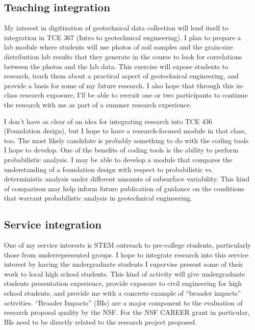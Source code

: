 \documentclass[10pt,letterpaper]{article}
\begin{document}
\subsection*{Teaching integration}
My interest in digitization of geotechnical data collection will lend itself to integration in TCE 367 (Intro to geotechnical engineering).
I plan to prepare a lab module where students will use photos of soil samples and the grain-size distribution lab results that they generate in the course to look for correlations between the photos and the lab data.
This exercise will expose students to research, teach them about a practical aspect of geotechnical engineering, and provide a basis for some of my future research.
I also hope that through this in-class research exposure, I'll be able to recruit one or two participants to continue the research with me as part of a summer research experience.

I don't have as clear of an idea for integrating research into TCE 436 (Foundation design), but I hope to have a research-focused module in that class, too.
The most likely candidate is probably something to do with the coding tools I hope to develop.
One of the benefits of coding tools is the ability to perform probabilistic analysis.
I may be able to develop a module that compares the understanding of a foundation design with respect to probabilistic vs. deterministic analysis under different amounts of subsurface variability.
This kind of comparison may help inform future publication of guidance on the conditions that warrant probabilistic analysis in geotechnical engineering.

\subsection*{Service integration}
One of my service interests is STEM outreach to pre-college students, particularly those from underrepresented groups.
I hope to integrate research into this service interest by having the undergraduate students I supervise present some of their work to local high school students.
This kind of activity will give undergraduate students presentation experience, provide exposure to civil engineering for high school students, and provide me with a concrete example of ``broader impacts'' activities.
``Broader Impacts'' (BIs) are a major component to the evaluation of research proposal quality by the NSF.
For the NSF CAREER grant in particular, BIs need to be directly related to the research project proposed.
\end{document}
